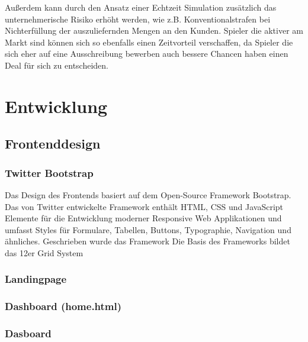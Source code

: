 \par Außerdem kann durch den Ansatz einer Echtzeit Simulation zusätzlich das unternehmerische Risiko erhöht werden, wie z.B. Konventionalstrafen bei Nichterfüllung der auszuliefernden Mengen an den Kunden. Spieler die aktiver am Markt sind können sich so ebenfalls einen Zeitvorteil verschaffen, da Spieler die sich eher auf eine Ausschreibung bewerben auch bessere Chancen haben einen Deal für sich zu entscheiden.
\chapter{Entwicklung}
\section{Frontenddesign}
\subsection{Twitter Bootstrap}
Das Design des Frontends basiert auf dem Open-Source Framework Bootstrap. Das von Twitter entwickelte Framework enthält HTML, CSS und JavaScript Elemente für die Entwicklung moderner Responsive Web Applikationen und umfasst Styles für Formulare, Tabellen, Buttons, Typographie, Navigation und ähnliches. Geschrieben wurde das Framework  Die Basis des Frameworks bildet das 12er Grid System
\subsection{Landingpage}
\subsection{Dashboard (home.html)}
\subsection{Dasboard}



